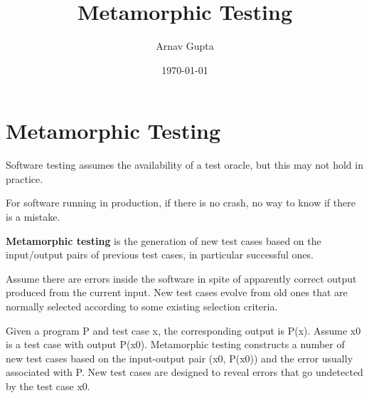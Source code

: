 \documentclass[11pt]{article}
\author{Arnav Gupta}
\date{\today}
\title{Metamorphic Testing}
\begin{document}
\maketitle
\tableofcontents

\section{Metamorphic Testing}
\label{sec:orgc2b53b8}
Software testing assumes the availability of a test oracle, but this may not hold in practice.

For software running in production, if there is no crash, no way to know if there is a mistake.

\textbf{Metamorphic testing} is the generation of new test cases based on the input/output pairs of
previous test cases, in particular successful ones.

Assume there are errors inside the software in spite of apparently correct output produced
from the current input.
New test cases evolve from old ones that are normally selected according to some existing
selection criteria.

Given a program P and test case x, the corresponding output is P(x).
Assume x0 is a test case with output P(x0).
Metamorphic testing constructs a number of new test cases based on the input-output pair
(x0, P(x0)) and the error usually associated with P.
New test cases are designed to reveal errors that go undetected by the test case x0.
\end{document}
